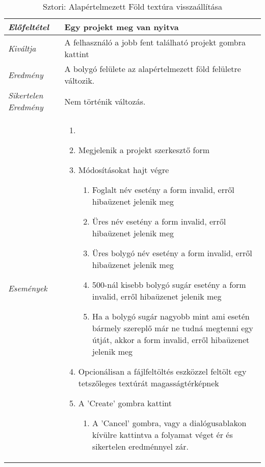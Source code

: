 \begin{table}[H]
	\centering
	\begin{tabular}{ | m{} | m{} | }
		\hline
		\emph{Előfeltétel} & Egy projekt meg van nyitva  \\
		\hline
		\emph{Kiváltja} & A felhasználó a jobb fent található projekt gombra kattint \\
		\hline
		\emph{Eredmény} & A bolygó felülete az alapértelmezett föld felületre változik. \\
		\hline
		\emph{Sikertelen Eredmény} & Nem történik változás.  \\
		\hline
		\hline
		\emph{Események} &

		\begin{enumerate}
			\item
			\item Megjelenik a projekt szerkesztő form
			\item Módosításokat hajt végre
			\begin{enumerate}
				\item Foglalt név esetény a form invalid, erről hibaüzenet jelenik meg
				\item Üres név esetény a form invalid, erről hibaüzenet jelenik meg
				\item Üres bolygó név esetény a form invalid, erről hibaüzenet jelenik meg
				\item 500-nál kisebb bolygó sugár esetény a form invalid, erről hibaüzenet jelenik meg
				\item Ha a bolygó sugár nagyobb mint ami esetén bármely szereplő már ne tudná megtenni egy útját, akkor a form invalid, erről hibaüzenet jelenik meg
			\end{enumerate}
			\item Opcionálisan a fájlfeltöltés eszközzel feltölt egy tetszőleges textúrát magasságtérképnek
			\item A 'Create' gombra kattint
			\begin{enumerate}
				\item A 'Cancel' gombra, vagy a dialógusablakon kívülre kattintva a folyamat véget ér és sikertelen eredménnyel zár.
			\end{enumerate}
		\end{enumerate}

		\\
		\hline
	\end{tabular}
	\caption{Sztori: Alapértelmezett Föld textúra visszaállítása}
	\label{tab:story-project-edit-earth-texture}
\end{table}

